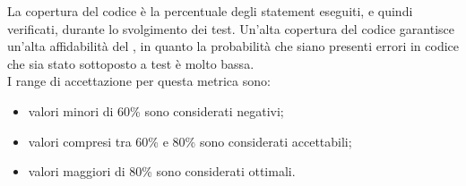 		La copertura del codice è la percentuale degli statement eseguiti, e quindi verificati, durante lo svolgimento dei test. Un'alta copertura del codice garantisce un'alta affidabilità del , in quanto la probabilità che siano presenti errori in codice che sia stato sottoposto a test è molto bassa.\\
		I range di accettazione per questa metrica sono:
		\begin{itemize}
			\item valori minori di 60\% sono considerati negativi;
			\item valori compresi tra 60\% e 80\% sono considerati accettabili;
			\item valori maggiori di 80\% sono considerati ottimali.
		\end{itemize}
		
